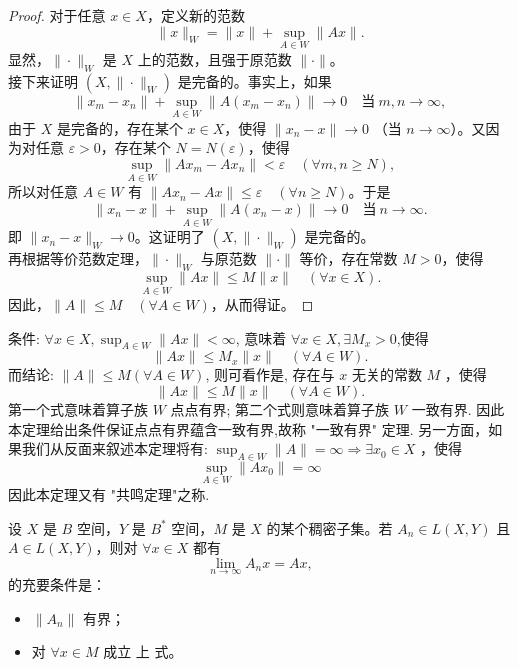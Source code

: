 \documentclass[lang=cn,newtx,10pt,scheme=chinese,thmcnt=chapter]{elegantbook}
\begin{document}
\begin{proof}
对于任意 $x \in X$，定义新的范数
\[
\|x\|_W = \|x\| + \sup_{A \in W} \|A x\|.
\]
显然，$\|\cdot\|_W$ 是 $X$ 上的范数，且强于原范数 $\|\cdot\|$。\\
接下来证明 $\left(X, \|\cdot\|_W\right)$ 是完备的。事实上，如果
\[
\|x_m - x_n\| + \sup_{A \in W} \|A(x_m - x_n)\| \to 0 \quad \text{当} \ m, n \to \infty,
\]
由于 $X$ 是完备的，存在某个 $x \in X$，使得 $\|x_n - x\| \to 0$ （当 $n \to \infty$）。又因为对任意 $\varepsilon > 0$，存在某个 $N = N(\varepsilon)$，使得
\[
\sup_{A \in W} \|A x_m - A x_n\| < \varepsilon \quad (\forall m, n \geqslant N),
\]
所以对任意 $A \in W$ 有 $\|A x_n - A x\| \leqslant \varepsilon \quad (\forall n \geqslant N)$。于是
\[
\|x_n - x\| + \sup_{A \in W} \|A(x_n - x)\| \to 0 \quad \text{当} \ n \to \infty.
\]
即 $\|x_n - x\|_W \to 0$。这证明了 $\left(X, \|\cdot\|_W\right)$ 是完备的。\\
再根据等价范数定理，$\|\cdot\|_W$ 与原范数 $\|\cdot\|$ 等价，存在常数 $M > 0$，使得
\[
\sup_{A \in W} \|A x\| \leqslant M \|x\| \quad (\forall x \in X).
\]
因此，$\|A\| \leqslant M \quad (\forall A \in W)$，从而得证。
\end{proof}
\begin{note}
条件: $\forall x \in X , \sup _{A \in W}\|A x\|<\infty$, 意味着 $\forall x \in X , \exists M_x>0$,使得
\begin{equation*}
\|A x\| \leqslant M_x\|x\| \quad(\forall A \in W) .
\end{equation*}
而结论: $\|A\| \leqslant M(\forall A \in W)$, 则可看作是, 存在与 $x$ 无关的常数 $M$ ，使得
\begin{equation*}
\|A x\| \leqslant M\|x\| \quad(\forall A \in W) .
\end{equation*}
第一个式意味着算子族 $W$ 点点有界; 第二个式则意味着算子族 $W$ 一致有界. 因此本定理给出条件保证点点有界蕴含一致有界,故称 "一致有界" 定理. 另一方面，如果我们从反面来叙述本定理将有: $\sup _{A \in W}\|A\|=\infty \Longrightarrow \exists x_0 \in X$ ，使得
\begin{equation*}
\sup _{A \in W}\left\|A x_0\right\|=\infty
\end{equation*}
因此本定理又有 "共鸣定理"之称.
\end{note}

\begin{theorem}
设 $X$ 是 $B$ 空间，$Y$ 是 $B^*$ 空间，$M$ 是 $X$ 的某个稠密子集。若 $A_n \in L(X, Y)$ 且 $A \in L(X, Y)$，则对 $\forall x \in X$ 都有
\[
\lim_{n \to \infty} A_n x = A x,
\]
的充要条件是：
\begin{itemize}
    \item[(1)] $\left\|A_n\right\|$ 有界；
    \item[(2)] 对 $\forall x \in M$ 成立 上 式。
\end{itemize}
\end{theorem}
\end{document}
